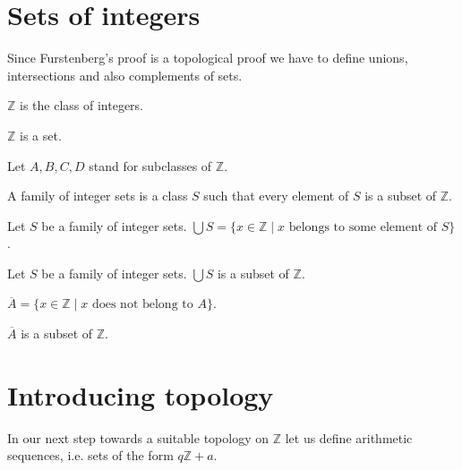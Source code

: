 \documentclass[english]{article}
\newcommand{\Int}{\mathbb{Z}}
\begin{document}
  \section{Sets of integers}

  Since Furstenberg's proof is a topological proof we have to define unions, intersections and also
  complements of sets.

  \begin{forthel}
    \begin{definition}
      $\Int$ is the class of integers.
    \end{definition}

    \begin{axiom}
      $\Int$ is a set.
    \end{axiom}

    Let $A,B,C,D$ stand for subclasses of $\Int$.

    \begin{definition}\label{IntegerSets}
      A family of integer sets is a class $S$ such that every element of $S$ is a subset of $\Int$.
    \end{definition}

    \begin{definition}\label{UnionSet}
      Let $S$ be a family of integer sets.
      $\bigcup S = \{ x \in \Int \mid x \text{ belongs to some element of } S \}$.
    \end{definition}

    \begin{lemma}
      Let $S$ be a family of integer sets.
      $\bigcup S$ is a subset of $\Int$.
    \end{lemma}

    \begin{definition}\label{Complement}
      $\overline{A} = \{ x \in \Int \mid x \text{ does not belong to } A \}$.
    \end{definition}

    \begin{lemma}
      $\overline{A}$ is a subset of $\Int$.
    \end{lemma}
   \end{forthel}


  \section{Introducing topology}

  In our next step towards a suitable topology on $\Int$ let us define arithmetic sequences, i.e.
  sets of the form $q \Int + a$.
\end{document}
